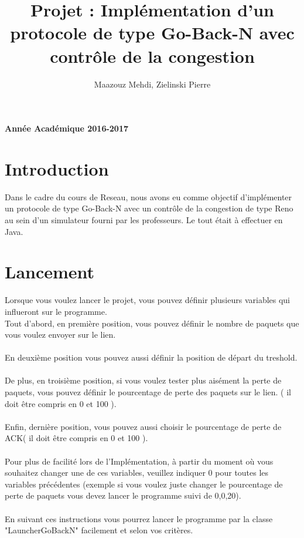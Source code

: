 \documentclass[a4paper,10pt]{article}
\begin{document}
\title{Projet : Implémentation d'un protocole de type Go-Back-N avec contrôle de la congestion}
\author{Maazouz Mehdi, Zielinski Pierre}
\maketitle
\begin{center}
\textbf{Année Académique 2016-2017}\\
\end{center}
\tableofcontents
\newpage

\section{Introduction}
Dans le cadre du cours de Reseau, nous avons eu comme objectif d'implémenter un protocole de type Go-Back-N
avec un contrôle de la congestion de type Reno au sein d'un simulateur fourni par les professeurs. Le tout était 
à effectuer en Java.

\section{Lancement}
Lorsque vous voulez lancer le projet, vous pouvez définir plusieurs variables qui influeront sur le programme.\\
Tout d'abord, en première position, vous pouvez définir le nombre de paquets que vous voulez envoyer sur le lien.\\
\\
En deuxième position vous pouvez aussi définir la position de départ du treshold.\\
\\
De plus, en troisième position, si vous voulez tester plus aisément la perte de paquets, vous pouvez définir le pourcentage de perte des paquets sur le lien.
( il doit être compris en 0 et 100 ).\\
\\
Enfin, dernière position, vous pouvez aussi choisir le pourcentage de perte de ACK( il doit être compris en 0 et 100 ).\\
\\
Pour plus de facilité lors de l'Implémentation, à partir du moment où vous souhaitez changer une de ces variables, veuillez indiquer 0 pour toutes les variables précédentes (exemple si vous voulez juste changer le pourcentage de perte de paquets vous devez lancer le programme suivi de 0,0,20).\\
\\
En suivant ces instructions vous pourrez lancer le programme par la classe "LauncherGoBackN" facilement et selon vos critères.
\end{document}
